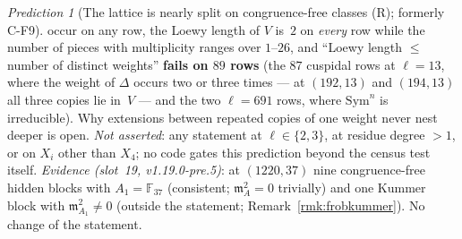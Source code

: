 \documentclass[11pt]{article}
\theoremstyle{remark}
\newtheorem{prediction}[theorem]{Prediction}
\newcommand{\F}{\mathbb{F}}
\newcommand{\Sym}{\mathrm{Sym}}
\newcommand{\m}{\mathfrak{m}}
\begin{document}
\begin{prediction}[The lattice is nearly split on congruence-free classes (R); formerly C-F9]
occur on any row, the Loewy length of $V$ is~$2$ on \emph{every} row while the number of pieces with multiplicity
ranges over $1$--$26$, and ``Loewy length $\le$ number of distinct weights'' \textbf{fails on $89$ rows} (the $87$
cuspidal rows at $\ell=13$, where the weight of $\Delta$ occurs two or three times --- at $(192,13)$ and $(194,13)$ all
three copies lie in~$V$ --- and the two $\ell=691$ rows, where $\Sym^n$ is irreducible). Why extensions between repeated
copies of one weight never nest deeper is open. \emph{Not asserted}: any statement at $\ell\in\{2,3\}$, at residue
degree $>1$, or on $X_i$ other than $X_4$; no code gates this prediction beyond the census test itself.
\emph{Evidence (slot~19, v1.19.0-pre.5)}: at $(1220,37)$ nine congruence-free hidden blocks with $A_1=\F_{37}$ (consistent; $\m_A^{2}=0$ trivially) and one Kummer block with
$\m_{A_1}^{2}\ne0$ (outside the statement; Remark~\ref{rmk:frobkummer}). No change of the statement.
\end{prediction}
\end{document}

